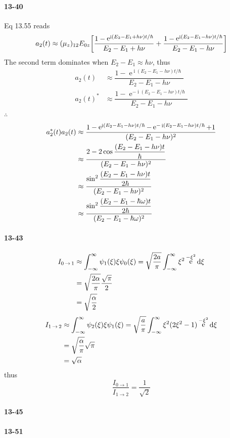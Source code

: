\documentclass[a4paper]{article}
\DeclareMathOperator{\intdinf}{\int_{-\infty}^\infty}
\DeclareMathOperator{\e}{\mathrm{e}}
\DeclareMathOperator{\I}{\mathrm{i}}
\DeclareMathOperator{\ra}{\rightarrow}
\newcommand{\ex}[1]{\paragraph{13-#1}}
\numberwithin{equation}{section}
\begin{document}
\ex{40}
Eq 13.55 reads
\begin{equation}\label{key}
a_2(t) \approx (\mu_z)_{12}E_{0z}\qty[\dfrac{1 - \e^{\I(E_2-E_1+h\nu)t/\hbar}}{E_2 - E_1 + h\nu} + \dfrac{1 - \e^{\I(E_2-E_1-h\nu)t/\hbar}}{E_2 - E_1 - h\nu}]
\end{equation}
The second term dominates when $ E_2 - E_1 \approx h\nu $, thus
\begin{align}
a_2(t) &\approx \dfrac{1 - \e^{\I(E_2-E_1-h\nu)t/\hbar}}{E_2 - E_1 - h\nu}\\
a_2(t)^* &\approx \dfrac{1 - \e^{-\I(E_2-E_1-h\nu)t/\hbar}}{E_2 - E_1 - h\nu}
\end{align}
$ \therefore $
\begin{align}
a_2^*(t)a_2(t) &\approx \dfrac{1 - \e^{\I(E_2-E_1-h\nu)t/\hbar} - \e^{-\I(E_2-E_1-h\nu)t/\hbar} + 1}{(E_2 - E_1 - h\nu)^2}\notag\\
&\approx \dfrac{2 - 2\cos\dfrac{(E_2-E_1-h\nu)t}{\hbar}}{(E_2 - E_1 - h\nu)^2}\notag\\
&\approx \dfrac{\sin^2\dfrac{(E_2-E_1-h\nu)t}{2\hbar}}{(E_2 - E_1 - h\nu)^2} \notag\\
&\approx \dfrac{\sin^2\dfrac{(E_2-E_1-\hbar\omega)t}{2\hbar}}{(E_2 - E_1 - \hbar\omega)^2} 
\end{align}

\ex{43}
\begin{align}
I_{0\ra 1} &\approx \intdinf \psi_1(\xi)\xi\psi_0(\xi) = \sqrt{\dfrac{2a}{\pi}}\intdinf \xi^2 \e^{-\xi^2}\dd\xi \notag\\
&= \sqrt{\dfrac{2\alpha}{\pi}} \dfrac{\sqrt{\pi}}{2} \notag\\
&= \sqrt{\dfrac{\alpha}{2}} 
\end{align}
\begin{align}
I_{1\ra 2} &\approx \intdinf \psi_2(\xi)\xi\psi_1(\xi) = \sqrt{\dfrac{a}{\pi}}\intdinf \xi^2(2\xi^2 - 1) \e^{-\xi^2}\dd\xi \notag\\
&= \sqrt{\dfrac{\alpha}{\pi}} \sqrt{\pi} \notag\\
&= \sqrt{\alpha}
\end{align}
thus
\begin{equation}\label{key}
\dfrac{I_{0\ra 1}}{I_{1\ra 2}} = \dfrac{1}{\sqrt{2}}
\end{equation}

\ex{45}

\ex{51}
\end{document}
